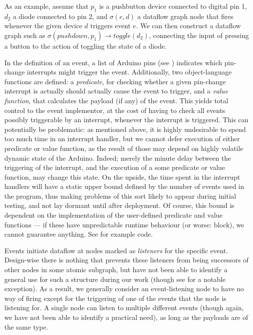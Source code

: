 \documentclass[a4paper, oneside, final]{memoir}
\let\Fref\undefined
\begin{document}
As an example, assume that $p_1$ is a pushbutton device connected to
digital pin 1, $d_2$ a diode connected to pin 2, and $\sigma(e,d)$ a
dataflow graph node that fires whenever the given device $d$ triggers
event $e$.  We can then construct a dataflow graph such as
$\sigma(pushdown,p_1) \rightarrow toggle(d_2)$, connecting the input
of pressing a button to the action of toggling the state of a diode.

In the definition of an event, a list of Arduino pins (see \Fref{sec:pins})
indicates which pin-change interrupts might trigger the event.
Additionally, two object-language functions are defined: a
\textit{predicate}, for checking whether a given pin-change interrupt
is actually should actually cause the event to trigger, and a
\textit{value function}, that calculates the payload (if any) of the
event.  This yields total control to the event implementor, at the
cost of having to check all events possibly triggerable by an
interrupt, whenever the interrupt is triggered.  This can potentially
be problematic: as mentioned above, it is highly undesirable to spend
too much time in an interrupt handler, but we cannot defer execution
of either predicate or value function, as the result of those may
depend on highly volatile dynamic state of the Arduino.  Indeed;
merely the minute delay between the triggering of the interrupt, and
the execution of a some predicate or value function, may change this
state.  On the upside, the time spent in the interrupt handlers will
have a static upper bound defined by the number of events used in the
program, thus making problems of this sort likely to appear during
initial testing, and not lay dormant until after deployment.  Of
course, this bound is dependent on the implementation of the
user-defined predicate and value functions --- if these have
unpredictable runtime behaviour (or worse: block), we cannot guarantee
anything.  See \Fref{sec:pushbuttondef} for example code.

Events initiate dataflow at nodes marked as \textit{listeners} for the
specific event.  Design-wise there is nothing that prevents these
listeners from being successors of other nodes in some atomic
subgraph, but have not been able to identify a general use for such a
structure during our work (though see \Fref{sec:postingwireimpl} for a
notable exception).  As a result, we generally consider an
event-listening node to have no way of firing except for the
triggering of one of the events that the node is listening for.  A
single node can listen to multiple different events (though again, we
have not been able to identify a practical need), as long as the
payloads are of the same type.
\end{document}
